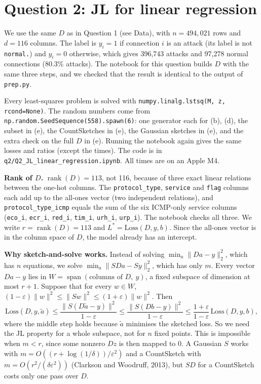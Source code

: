 \clearpage
\section*{Question 2: JL for linear regression}

We use the same $D$ as in Question 1 (see Data), with $n = 494{,}021$ rows and $d = 116$ columns. The label is
$y_i = 1$ if connection $i$ is an attack (its label is not \texttt{normal.}) and $y_i = 0$ otherwise,
which gives 396{,}743 attacks and 97{,}278 normal connections (80.3\% attacks).
The notebook for this question builds $D$ with the same three steps, and we checked that the result is
identical to the output of \texttt{prep.py}.

Every least-squares problem is solved with \texttt{numpy.linalg.lstsq(M, z, rcond=None)}. The random
numbers come from \texttt{np.random.SeedSequence(558).spawn(6)}: one generator each for (b), (d),
the subset in (e), the CountSketches in (e), the Gaussian sketches in (e), and the extra check on the full
$D$ in (e). Running the notebook again gives the same losses and ratios (except the times). The code is in
\texttt{q2/Q2\_JL\_linear\_regression.ipynb}. All times are on an Apple M4.

\textbf{Rank of $D$.} $\operatorname{rank}(D) = 113$, not 116, because of three exact linear relations
between the one-hot columns. The \texttt{protocol\_type}, \texttt{service} and \texttt{flag} columns each
add up to the all-ones vector (two independent relations), and \texttt{protocol\_type\_icmp} equals the sum
of the six ICMP-only service columns (\texttt{eco\_i}, \texttt{ecr\_i}, \texttt{red\_i}, \texttt{tim\_i},
\texttt{urh\_i}, \texttt{urp\_i}). The notebook checks all three. We write $r = \operatorname{rank}(D) = 113$
and $L^* = \text{Loss}(D,y,b)$. Since the all-ones vector is in the column space of $D$, the model already
has an intercept.

\textbf{Why sketch-and-solve works.} Instead of solving $\min_a \|Da-y\|_2^2$, which has $n$ equations,
we solve $\min_a \|SDa-Sy\|_2^2$, which has only $m$. Every vector $Da-y$ lies in
$W = \operatorname{span}(\text{columns of } D,\ y)$, a fixed subspace of dimension at most $r+1$.
Suppose that for every $w \in W$,
$(1-\varepsilon)\|w\|^2 \le \|Sw\|^2 \le (1+\varepsilon)\|w\|^2$. Then
\[
\text{Loss}(D,y,\tilde a)
\le \frac{\|S(D\tilde a-y)\|^2}{1-\varepsilon}
\le \frac{\|S(Db-y)\|^2}{1-\varepsilon}
\le \frac{1+\varepsilon}{1-\varepsilon}\,\text{Loss}(D,y,b),
\]
where the middle step holds because $\tilde a$ minimises the sketched loss. So we need the JL property for
a whole subspace, not for $n$ fixed points. This is impossible when $m < r$, since some nonzero $Dz$ is then
mapped to $0$. A Gaussian $S$ works with $m = O((r+\log(1/\delta))/\varepsilon^2)$ and a CountSketch with
$m = O(r^2/(\delta\varepsilon^2))$ (Clarkson and Woodruff, 2013), but $SD$ for a CountSketch costs only one
pass over $D$.

